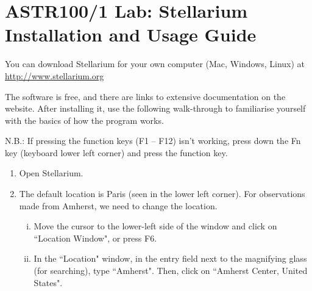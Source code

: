 \documentclass[main.tex]{subfiles}
\begin{document}
\rightline{\today}
\section*{ASTR100/1 Lab: Stellarium Installation and Usage Guide}
You can download Stellarium for your own computer (Mac, Windows, Linux) at \url{http://www.stellarium.org}

The software is free, and there are links to extensive documentation on the website. After installing it, use the following walk-through to familiarise yourself with the basics of how the program works.

N.B.: If pressing the function keys (F1 -- F12) isn't working, press down the Fn key (keyboard lower left corner) and press the function key.
\begin{enumerate}
\item
Open Stellarium.
\item
The default location is Paris (seen in the lower left corner). For observations made from Amherst, we need to change the location.
\begin{enumerate}[i.]
    \item
    Move the cursor to the lower-left side of the window and click on ``Location Window", or press F6.
    \item
    In the “Location" window, in the entry field next to the magnifying glass (for searching), type ``Amherst". Then, click on ``Amherst Center, United States".
    

\end{enumerate}
\end{enumerate}
\end{document}
